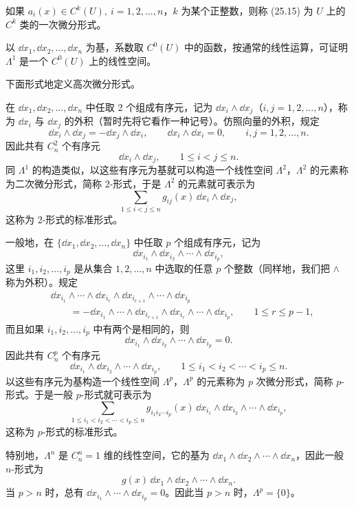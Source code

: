 \begin{xremark}
如果 $a_i(x)\in C^k(U),\ i=1,2,\ldots,n$，$k$ 为某个正整数，则称 (25.15) 为 $U$ 上的 $C^k$ 类的一次微分形式。
\end{xremark}

\begin{xremark}
以 $\dd x_1,\dd x_2,\ldots,\dd x_n$ 为基，系数取 $C^0(U)$ 中的函数，按通常的线性运算，可证明 $\Lambda^1$ 是一个 $C^0(U)$ 上的线性空间。
\end{xremark}

下面形式地定义高次微分形式。

在 $\dd x_1,\dd x_2,\ldots,\dd x_n$ 中任取 2 个组成有序元，记为 $\dd x_i\wedge\dd x_j$（$i,j=1,2,\ldots,n$），称为 $\dd x_i$ 与 $\dd x_j$ 的外积（暂时先将它看作一种记号）。仿照向量的外积，规定
\[
  \dd x_i\wedge\dd x_j=-\dd x_j\wedge\dd x_i,\qquad
  \dd x_i\wedge\dd x_i=0,
  \qquad i,j=1,2,\ldots,n.
\]
因此共有 $C_n^2$ 个有序元
\[
  \dd x_i\wedge\dd x_j,\qquad1\le i<j\le n.
\]
同 $\Lambda^1$ 的构造类似，以这些有序元为基就可以构造一个线性空间 $\Lambda^2$，$\Lambda^2$ 的元素称为二次微分形式，简称 2-形式，于是 $\Lambda^2$ 的元素就可表示为
\[
  \sum_{1\le i<j\le n}g_{ij}(x)\,\dd x_i\wedge\dd x_j,
\]
这称为 2-形式的标准形式。

一般地，在 $\{\dd x_1,\dd x_2,\ldots,\dd x_n\}$ 中任取 $p$ 个组成有序元，记为
\[
  \dd x_{i_1}\wedge\dd x_{i_2}\wedge\cdots\wedge\dd x_{i_p},
\]
这里 $i_1,i_2,\ldots,i_p$ 是从集合 $1,2,\ldots,n$ 中选取的任意 $p$ 个整数（同样地，我们把 $\wedge$ 称为外积）。规定
\begin{align*}
&\dd x_{i_1}\wedge\cdots\wedge\dd x_{i_r}\wedge\dd x_{i_{r+1}}\wedge\cdots\wedge\dd x_{i_p}\\
&\qquad=-\dd x_{i_1}\wedge\cdots\wedge\dd x_{i_{r+1}}\wedge\dd x_{i_r}\wedge\cdots\wedge\dd x_{i_p},\qquad1\le r\le p-1,
\end{align*}
而且如果 $i_1,i_2,\ldots,i_p$ 中有两个是相同的，则
\[
  \dd x_{i_1}\wedge\dd x_{i_2}\wedge\cdots\wedge\dd x_{i_p}=0.
\]
因此共有 $C_n^p$ 个有序元
\[
  \dd x_{i_1}\wedge\dd x_{i_2}\wedge\cdots\wedge\dd x_{i_p},\qquad1\le i_1<i_2<\cdots<i_p\le n.
\]
以这些有序元为基构造一个线性空间 $\Lambda^p$，$\Lambda^p$ 的元素称为 $p$ 次微分形式，简称 $p$-形式。于是一般 $p$-形式就可表示为
\[
  \sum_{1\le i_1<i_2<\cdots<i_p\le n}g_{i_1i_2\cdots i_p}(x)
  \,\dd x_{i_1}\wedge\dd x_{i_2}\wedge\cdots\wedge\dd x_{i_p},
\]
这称为 $p$-形式的标准形式。

特别地，$\Lambda^n$ 是 $C_n^n=1$ 维的线性空间，它的基为 $\dd x_1\wedge\dd x_2\wedge\cdots\wedge\dd x_n$，因此一般 $n$-形式为
\[
  g(x)\,\dd x_1\wedge\dd x_2\wedge\cdots\wedge\dd x_n.
\]
当 $p>n$ 时，总有 $\dd x_{i_1}\wedge\cdots\wedge\dd x_{i_p}=0$。因此当 $p>n$ 时，$\Lambda^p=\{0\}$。

